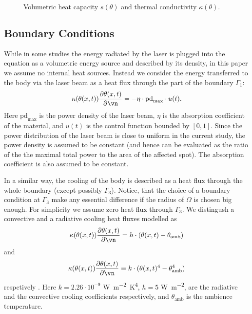 \begin{figure}[ht]
	\centering
	
	
	\caption{Volumetric heat capacity $s(\theta)$ and thermal conductivity $\kappa(\theta)$.}
	\label{fig:coef}
\end{figure}



\subsection{Boundary Conditions}

While in some studies the energy radiated by the laser is plugged into the equation as a volumetric energy source and described by its density, in this paper we assume no internal heat sources.
Instead we consider the energy transferred to the body via the laser beam as a heat flux through the part of the boundary $\Gamma_1$:
\begin{equation}
	\kappa(\theta(x,t)) \frac{\partial \theta(x,t)}{\partial \vn} = - \eta \cdot \text{pd}_{\max} \cdot u(t).
\end{equation}
Here $\text{pd}_{\max}$ is the power density of the laser beam, $\eta$ is the absorption coefficient of the material, and $u(t)$ is the control function bounded by $[0,1]$.
Since the power distribution of the laser beam is close to uniform in the current study, the power density is assumed to be constant (and hence can be evaluated as the ratio of the the maximal total power to the area of the affected spot). The absorption coefficient is also assumed to be constant.

In a similar way, the cooling of the body is described as a heat flux through the whole boundary (except possibly $\Gamma_3$). Notice, that the choice of a boundary condition at $\Gamma_3$ make any essential difference if the radius of $\Omega$ is chosen big enough.
For simplicity we assume zero heat flux through $\Gamma_3$.
We distingush a convective and a radiative cooling heat fluxes modelled as
\begin{equation}
	\kappa(\theta(x,t)) \frac{\partial \theta(x,t)}{\partial \vn} = h \cdot (\theta(x,t) - \theta_\text{amb})
\end{equation}
and
\begin{equation}
	\kappa(\theta(x,t)) \frac{\partial \theta(x,t)}{\partial \vn} = k \cdot (\theta(x,t)^4 - \theta^4_\text{amb})
\end{equation}
respctively .
Here $k = 2.26 \cdot 10^{-9}$ \si{\W\per\m^2\K^4}, $h = 5$ \si{\W\per\m^2}, are the radiative and the convective cooling coefficients respectively, and $\theta_\text{amb}$ is the ambience temperature.

